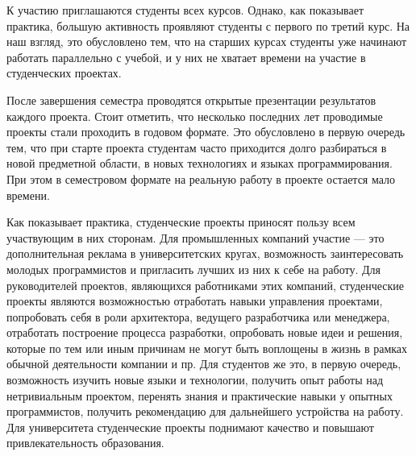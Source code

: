 \documentclass[a4paper]{article}
\begin{document}
К участию приглашаются студенты всех курсов. Однако, как показывает практика, б\textit{о}льшую активность проявляют студенты с первого по третий курс. На наш взгляд, это обусловлено тем, что на старших курсах студенты уже начинают работать параллельно с учебой, и у них не хватает времени на участие в студенческих проектах. 

После завершения семестра проводятся открытые презентации результатов каждого проекта. Стоит отметить, что несколько последних лет проводимые проекты стали проходить в годовом формате. Это обусловлено в первую очередь тем, что при старте проекта студентам часто приходится долго разбираться в новой предметной области, в новых технологиях и языках программирования. При этом в семестровом формате на реальную работу в проекте остается мало времени. 

Как показывает практика, студенческие проекты приносят пользу всем участвующим в них сторонам. Для промышленных компаний участие --- это дополнительная реклама в университетских кругах, возможность заинтересовать молодых программистов и пригласить лучших из них к себе на работу. Для руководителей проектов, являющихся работниками этих компаний, студенческие проекты являются возможностью отработать навыки управления проектами, попробовать себя в роли архитектора, ведущего разработчика или менеджера, отработать построение процесса разработки, опробовать новые идеи и решения, которые по тем или иным причинам не могут быть воплощены в жизнь в рамках обычной деятельности компании и пр. Для студентов же это, в первую очередь, возможность изучить новые языки и технологии, получить опыт работы над нетривиальным проектом, перенять знания и практические навыки у опытных программистов, получить рекомендацию для дальнейшего устройства на работу. Для университета студенческие проекты поднимают качество и повышают привлекательность образования.   
\end{document}
